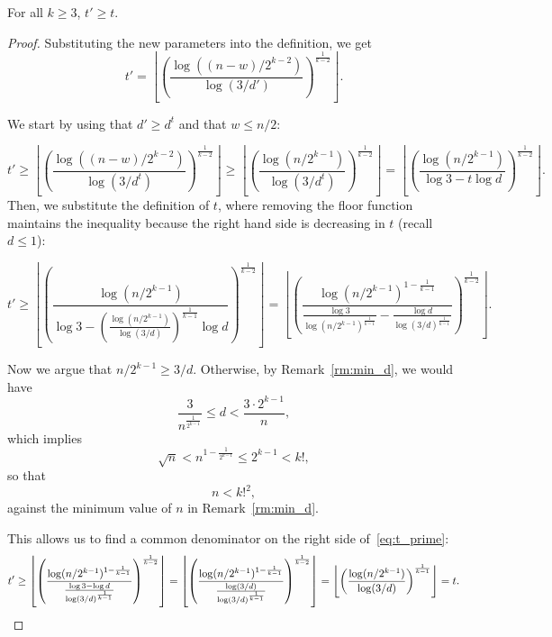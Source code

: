 \begin{lemma}\label{lm:t_prime}
    For all $k \geq 3$, $t' \geq t$.

    \begin{proof}

        Substituting the new parameters into the definition, we get
        \[
            t' = \left\lfloor \left(\frac{\log ((n-w)/2^{k-2})}{\log (3/d')} \right)^
            {\frac{1}{k-2}} \right\rfloor.
        \]

        We start by using that $d' \geq d^t$ and that $w \leq n/2$:

        \[
            t' \geq
            \left\lfloor \left(  \frac{\log ((n-w)/2^{k-2})}{\log (3/d^t)} \right)^
            {\frac{1}{k-2}} \right\rfloor \geq
            \left\lfloor \left(  \frac{\log (n/2^{k-1})}{\log (3/d^t)} \right)^{\frac{1}{k-2}} \right\rfloor =
            \left\lfloor \left(  \frac{\log (n / 2^{k-1})}{\log 3 - t \log d} \right)^
            {\frac{1}{k-2}} \right\rfloor.
        \]
        Then, we substitute the definition of $t$, where removing the floor function
        maintains the inequality because the right hand side is decreasing in $t$ (recall $d \leq 1$):

        \begin{equation} \label{eq:t_prime}
            t' \geq
            \left\lfloor \left(  \frac{\log (n / 2^{k-1})}
            {\log 3 - \left(  \frac{\log (n / 2^{k-1})}{\log (3/d)} \right)^{\frac{1}{k-1}}  \log d} \right)^
            {\frac{1}{k-2}} \right\rfloor
            =
            \left\lfloor \left(  \frac{\log (n / 2^{k-1})^{1-\frac{1}{k-1}}}
            {\frac{\log 3}{\log(n / 2^{k-1})^{\frac{1}{k-1}}} - \frac{\log d}{\log (3/d)^{\frac{1}{k-1}}} }
            \right)^{\frac{1}{k-2}} \right\rfloor.
        \end{equation}

        Now we argue that $n/2^{k-1} \geq 3/d$.
        Otherwise, by Remark~\ref{rm:min_d}, we would have
        \[
            \frac{3}{n^{\frac{1}{2^{k-1}}}} \leq d < \frac{3 \cdot 2^{k-1}}{n},
        \]
        which implies
        \[
            \sqrt{n} < n^{1 - \frac{1}{2^{k-1}}} \leq 2^{k-1} < k!,
        \]
        so that
        \[
            n < k!^2,
        \]
        against the minimum value of $n$ in Remark~\ref{rm:min_d}.

        This allows us to find a common denominator on the
        right side of~\eqref{eq:t_prime}:
        \[
            t' \geq
            \left\lfloor \left(  \frac{\log (n / 2^{k-1})^{1-\frac{1}{k-1}}}
            {\frac{\log 3 - \log d}{\log(3 / d)^{\frac{1}{k-1}}} } \right)^
            {\frac{1}{k-2}} \right\rfloor =
            \left\lfloor \left(  \frac{\log (n / 2^{k-1})^{1-\frac{1}{k-1}}}
            {\frac{\log (3 / d)}{\log(3 / d)^{\frac{1}{k-1}}} } \right)^
            {\frac{1}{k-2}} \right\rfloor =
            \left\lfloor \left(  \frac{\log (n / 2^{k-1})}
            {\log (3 / d)} \right)^
            {\frac{1}{k-1}} \right\rfloor =
            t. \qedhere
        \]
    \end{proof}
\end{lemma}

